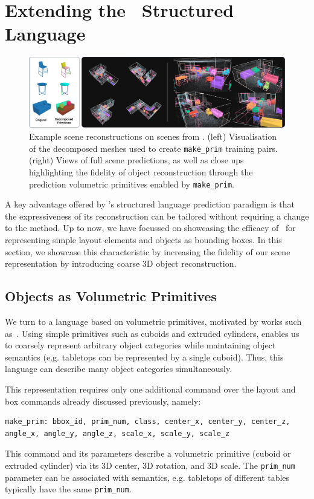 \section{Extending the \METHOD~Structured Language}
\label{section:extendability}

\begin{figure}[t]
    \centering
    \includegraphics[width=\textwidth]{figs/ase_primitives.jpg}
    \caption{Example scene reconstructions on scenes from \DatasetName{}.
        (left) Visualisation of the decomposed meshes used to create \texttt{make\_prim} training pairs.
        (right) Views of full scene predictions, as well as close ups highlighting the fidelity of object reconstruction through the prediction volumetric primitives enabled by \texttt{make\_prim}.}
    \label{fig:commandVisExamples1}
\end{figure}



A key advantage offered by \METHOD's structured language prediction paradigm is that the expressiveness of its reconstruction can be tailored without requiring a change to the method. Up to now, we have focussed on showcasing the efficacy of \METHOD~for representing simple layout elements and objects as bounding boxes. In this section, we showcase this characteristic by increasing the fidelity of our scene representation by introducing coarse 3D object reconstruction. 



\subsection{Objects as Volumetric Primitives}
We turn to a language based on volumetric primitives, motivated by works such as~\cite{tulsiani2017learning,yang2021unsupervised}. 
Using simple primitives such as cuboids and extruded cylinders, enables us to coarsely represent arbitrary object categories while maintaining object semantics (e.g. tabletops can be represented by a single cuboid). 
Thus, this language can describe many object categories simultaneously.

This representation requires only one additional command over the layout and box commands already discussed previously, namely:
\begin{lstlisting}[language=StructuredLanguage]
make_prim: bbox_id, prim_num, class, center_x, center_y, center_z, angle_x, angle_y, angle_z, scale_x, scale_y, scale_z
\end{lstlisting}
This command and its parameters describe a volumetric primitive (cuboid or extruded cylinder) via its 3D center, 3D rotation, and 3D scale. The \texttt{prim\_num} parameter can be associated with semantics, e.g. tabletops of different tables typically have the same \texttt{prim\_num}.

